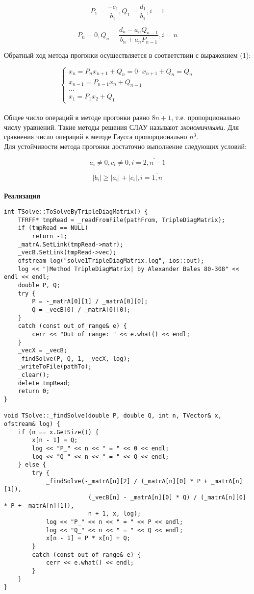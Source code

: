 $$
P_1=\frac{-c_1}{b_1}, Q_1=\frac{d_1}{b_1}, i=1
$$

$$
P_n=0, Q_n=\frac{d_n-a_nQ_{n-1}}{b_n+a_nP_{n-1}}, i=n
$$

Обратный ход метода прогонки осуществляется в соответствии с выражением (1):

$$
\begin{cases}
x_n=P_nx_{n+1}+Q_n=0 \cdot x_{n+1}+Q_n=Q_n\\
x_{n-1}=P_{n-1}x_n+Q_{n-1}\\
...\\
x_1=P_1x_2+Q_1
\end{cases}
$$\\

Общее число операций в методе прогонки равно $8n+1$, т.е. пропорционально числу уравнений. Такие методы решения СЛАУ называют \textit{экономичными}. Для сравнения число операций в методе Гаусса пропорционально $n^3$.\\

Для устойчивости метода прогонки достаточно выполнение следующих условий:

$$
a_i \neq 0, c_i \neq 0, i=\overline{2,n-1}
$$

$$
|b_i| \geq |a_i|+|c_i|, i=\overline{1,n}
$$\\

\textbf{Реализация}

\begin{lstlisting}
int TSolve::ToSolveByTripleDiagMatrix() {
    TFRFF* tmpRead = _readFromFile(pathFrom, TripleDiagMatrix);
    if (tmpRead == NULL)
        return -1;
    _matrA.SetLink(tmpRead->matr);
    _vecB.SetLink(tmpRead->vec);
    ofstream log("solve1TripleDiagMatrix.log", ios::out);
    log << "|Method TripleDiagMatrix| by Alexander Bales 80-308" << endl << endl;
    double P, Q;
    try {
        P = -_matrA[0][1] / _matrA[0][0];
        Q = _vecB[0] / _matrA[0][0];            
    }
    catch (const out_of_range& e) {
        cerr << "Out of range: " << e.what() << endl;
    }
    _vecX = _vecB;    
    _findSolve(P, Q, 1, _vecX, log);        
    _writeToFile(pathTo);
    _clear();
    delete tmpRead; 
    return 0;
}

void TSolve::_findSolve(double P, double Q, int n, TVector& x, ofstream& log) {
    if (n == x.GetSize()) {
        x[n - 1] = Q;
        log << "P_" << n << " = " << 0 << endl;
        log << "Q_" << n << " = " << Q << endl;
    } else {
        try {
            _findSolve(-_matrA[n][2] / (_matrA[n][0] * P + _matrA[n][1]),
                        (_vecB[n] - _matrA[n][0] * Q) / (_matrA[n][0] * P + _matrA[n][1]),
                        n + 1, x, log);
            log << "P_" << n << " = " << P << endl;
            log << "Q_" << n << " = " << Q << endl;
            x[n - 1] = P * x[n] + Q;           
        }
        catch (const out_of_range& e) {
            cerr << e.what() << endl;
        }
    }        
}
\end{lstlisting}
\vspace{0.5cm}


